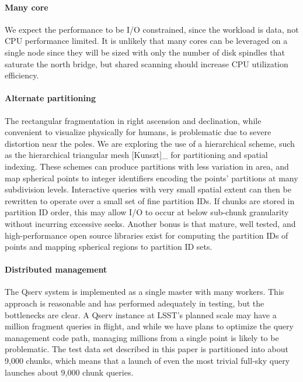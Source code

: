 \documentclass[DM,lsstdraft,toc]{lsstdoc}
\begin{document}
\paragraph{Many core}\label{many-core}

We expect the performance to be I/O constrained, since the workload is
data, not CPU performance limited. It is unlikely that many cores can be
leveraged on a single node since they will be sized with only the number
of disk spindles that saturate the north bridge, but shared scanning
should increase CPU utilization efficiency.

\paragraph{Alternate partitioning}\label{alternate-partitioning}

The rectangular fragmentation in right ascension and declination, while
convenient to visualize physically for humans, is problematic due to
severe distortion near the poles. We are exploring the use of a
hierarchical scheme, such as the hierarchical triangular mesh
{[}Kunszt{]}\_ for partitioning and spatial indexing. These schemes can
produce partitions with less variation in area, and map spherical points
to integer identifiers encoding the points' partitions at many
subdivision levels. Interactive queries with very small spatial extent
can then be rewritten to operate over a small set of fine partition IDs.
If chunks are stored in partition ID order, this may allow I/O to occur
at below sub-chunk granularity without incurring excessive seeks.
Another bonus is that mature, well tested, and high-performance open
source libraries exist for computing the partition IDs of points and
mapping spherical regions to partition ID sets.

\paragraph{Distributed management}\label{distributed-management}

The Qserv system is implemented as a single master with many workers.
This approach is reasonable and has performed adequately in testing, but
the bottlenecks are clear. A Qserv instance at LSST's planned scale may
have a million fragment queries in flight, and while we have plans to
optimize the query management code path, managing millions from a single
point is likely to be problematic. The test data set described in this
paper is partitioned into about 9,000 chunks, which means that a launch
of even the most trivial full-sky query launches about 9,000 chunk
queries.
\end{document}
